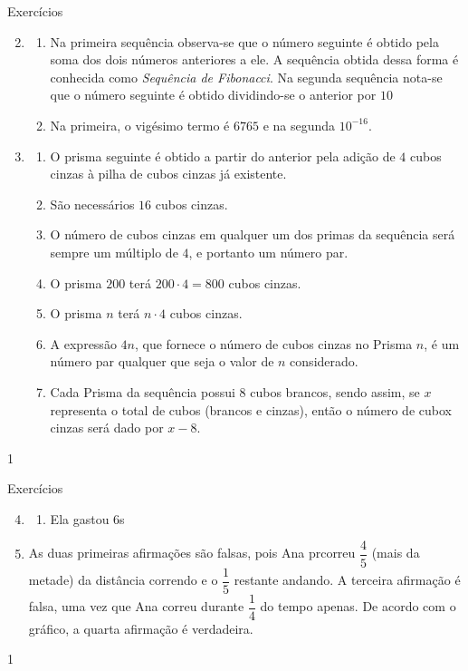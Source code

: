 \clearmargin
\begin{answer}{Exercícios}
{\exerciselist
  \begin{enumerate}\setcounter{enumi}{1}
  \item 
  \begin{enumerate}
  \item Na primeira sequência observa-se que o número seguinte é obtido pela soma dos dois números anteriores a ele. A sequência obtida dessa forma é conhecida como \textit{Sequência de Fibonacci}. Na segunda sequência nota-se que o número seguinte é obtido dividindo-se o anterior por $10$
  \item Na primeira, o vigésimo termo é $6765$ e na segunda $10^{-16}$.
  \end{enumerate}


  \item
  \begin{enumerate}
  \item O prisma seguinte é obtido a partir do anterior pela adição de $4$ cubos cinzas à pilha de cubos cinzas já existente.
  \item São necessários $16$ cubos cinzas.
  \item O número de cubos cinzas em qualquer um dos primas da sequência será sempre um múltiplo de $4$, e portanto um número par.
  \item O prisma $200$ terá $200\cdot4=800$ cubos cinzas.
  \item O prisma $n$ terá $n\cdot4$ cubos cinzas.
  \item A expressão $4n$, que fornece o número de cubos cinzas no Prisma $n$, é um número par qualquer que seja o valor de $n$ considerado.
  \item Cada Prisma da sequência possui $8$ cubos brancos, sendo assim, se $x$ representa o total de cubos (brancos e cinzas), então o número de cubox cinzas será dado por $x-8$.
  \end{enumerate}
  \end{enumerate}
}{1}
\end{answer}
\clearmargin
\begin{answer}{Exercícios}
{\exerciselist
  \begin{enumerate}\setcounter{enumi}{3}
  \item 
  \begin{enumerate}
  \item Ela gastou $6$s
  \end{enumerate}
  \item
  As duas primeiras afirmações são falsas, pois Ana prcorreu $\dfrac{4}{5}$ (mais da metade) da distância correndo e o $\dfrac{1}{5}$ restante andando. A terceira afirmação é falsa, uma vez que Ana correu durante $\dfrac{1}{4}$  do tempo apenas. De acordo com o gráfico, a quarta afirmação é verdadeira.
  \end{enumerate}
}{1}
\end{answer}
